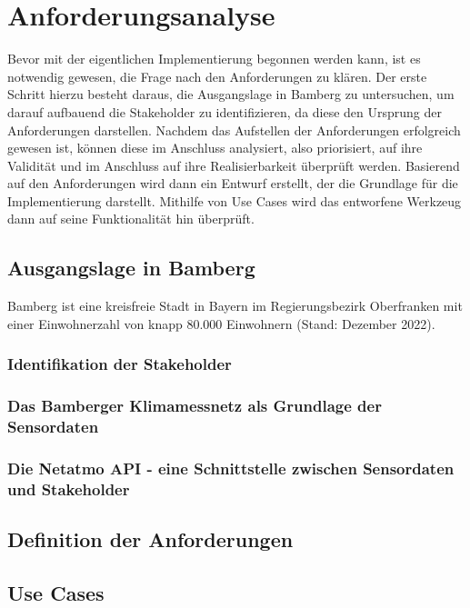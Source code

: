 \chapter{Anforderungsanalyse} %
\label{sec:requirements}
Bevor mit der eigentlichen Implementierung begonnen werden kann, ist es notwendig gewesen, die Frage nach den Anforderungen zu klären. Der erste Schritt 
hierzu besteht daraus, die Ausgangslage in Bamberg zu untersuchen, um darauf aufbauend die Stakeholder zu identifizieren, da diese den Ursprung der Anforderungen 
darstellen. Nachdem das Aufstellen der Anforderungen erfolgreich gewesen ist, können diese im Anschluss analysiert, also priorisiert, auf ihre Validität und im Anschluss 
auf ihre Realisierbarkeit überprüft werden. Basierend auf den Anforderungen wird dann ein Entwurf erstellt, der die Grundlage für die Implementierung darstellt. Mithilfe von 
Use Cases wird das entworfene Werkzeug dann auf seine Funktionalität hin überprüft.

\section{Ausgangslage in Bamberg}
\label{sec:ausgangslage}
Bamberg ist eine kreisfreie Stadt in Bayern im Regierungsbezirk Oberfranken mit einer Einwohnerzahl von knapp 80.000 Einwohnern 
(Stand: Dezember 2022). %

\subsection{Identifikation der Stakeholder}
\label{sec:stakeholder}

\subsection{Das Bamberger Klimamessnetz als Grundlage der Sensordaten}

\subsection{Die Netatmo API - eine Schnittstelle zwischen Sensordaten und Stakeholder}

\section{Definition der Anforderungen}

\section{Use Cases}
